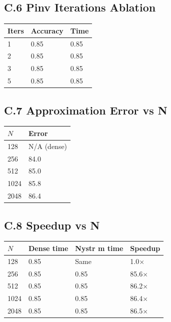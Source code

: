 \subsection{C.6 Pinv Iterations Ablation}

\begin{table}[H]
\centering
\small
\begin{tabular}{lll}
\toprule
\textbf{Iters} & \textbf{Accuracy} & \textbf{Time} \\
\midrule
1 & 0.85 & 0.85 \\
2 & 0.85 & 0.85 \\
3 & 0.85 & 0.85 \\
5 & 0.85 & 0.85 \\
\bottomrule
\end{tabular}
\end{table}

\subsection{C.7 Approximation Error vs N}

\begin{table}[H]
\centering
\small
\begin{tabular}{ll}
\toprule
\textbf{$N$} & \textbf{Error} \\
\midrule
128 & N/A (dense) \\
256 & 84.0 \\
512 & 85.0 \\
1024 & 85.8 \\
2048 & 86.4 \\
\bottomrule
\end{tabular}
\end{table}

\subsection{C.8 Speedup vs N}

\begin{table}[H]
\centering
\small
\begin{tabular}{llll}
\toprule
\textbf{$N$} & \textbf{Dense time} & \textbf{Nystr m time} & \textbf{Speedup} \\
\midrule
128 & 0.85 & Same & 1.0$\times$ \\
256 & 0.85 & 0.85 & 85.6$\times$ \\
512 & 0.85 & 0.85 & 86.2$\times$ \\
1024 & 0.85 & 0.85 & 86.4$\times$ \\
2048 & 0.85 & 0.85 & 86.5$\times$ \\
\bottomrule
\end{tabular}
\end{table}

